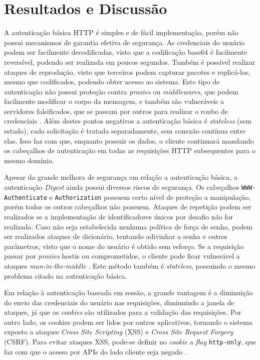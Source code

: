 \section{Resultados e Discussão}

A autenticação básica HTTP é simples e de fácil implementação, porém não possui mecanismos de 
garantia efetiva de segurança. As credenciais do usuário podem ser facilmente decodificadas, visto 
que a codificação base64 é facilmente reversível, podendo ser realizada em poucos segundos. Também 
é possível realizar ataques de reprodução, visto que terceiros podem capturar pacotes e replicá-los, 
mesmo que codificados, podendo obter acesso ao sistema. Este tipo de autenticação não possui proteção 
contra \emph{proxies} ou \emph{middlewares}, que podem facilmente modificar o corpo da mensagem, e 
também são vulneráveis a servidores falsificados, que se passam por outros para realizar o roubo de 
credenciais \cite{GOURLEY2002}. Além destes pontos negativos a autenticação básica é 
\emph{stateless} (sem estado), cada solicitação é tratada separadamente, sem conexão contínua entre 
elas. Isso faz com que, enquanto possuir os dados, o cliente continuará mandando os cabeçalhos de 
autenticação em todas as requisições HTTP subsequentes para o mesmo domínio.

Apesar da grande melhora de segurança em relação a autenticação básica, a autenticação 
\emph{Digest} ainda possui diversos riscos de segurança. Os cabeçalhos 
\texttt{WWW-Authenticate} e \texttt{Authorization} possuem certo nível de proteção a manipulação, 
porém todos os outros cabeçalhos não possuem. Ataques de repetição podem ser realizados se a implementação de 
identificadores únicos por desafio não for realizada. Caso não seja estabelecida nenhuma política de 
força de senha, podem ser realizados ataques de dicionário, tentando adivinhar a senha e outros 
parâmetros, visto que o nome do usuário é obtido sem esforço. Se a requisição passar por 
\emph{proxies} hostis ou comprometidos, o cliente pode ficar vulnerável a ataques 
\emph{man-in-the-middle} \cite{GOURLEY2002}. Este método também é \emph{stateless}, possuindo o 
mesmo problema citado na autenticação básica.

Em relação à autenticação baseada em sessão, a grande vantagem é a diminuição do envio das 
credenciais do usuário nas requisições, diminuindo a janela de ataques, já que os \emph{cookies} 
são utilizados para a validação das requisições. Por outro lado, os cookies podem ser lidos por 
outros aplicativos, tornando o sistema exposto a ataques \emph{Cross Site Scripting} (XSS) e 
\emph{Cross Site Request Forgery} (CSRF). Para evitar ataques XSS, pode-se definir no \emph{cookie} 
a \emph{flag} \texttt{http-only}, que faz com que o acesso por APIs do lado cliente seja negado 
\cite{PAPATHANASAKI2022}.

